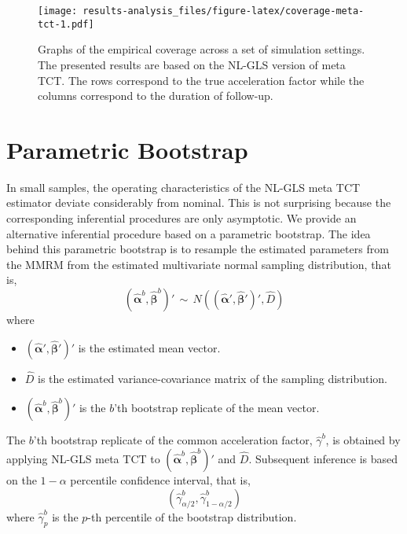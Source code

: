 \documentclass[
]{article}
\providecommand{\tightlist}{%
  \setlength{\itemsep}{0pt}\setlength{\parskip}{0pt}}
\begin{document}
\begin{figure}
\centering
\texttt{[image: results-analysis\_files/figure-latex/coverage-meta-tct-1.pdf]}
\caption{\label{fig:coverage-meta-tct}Graphs of the empirical coverage across a set of simulation settings. The presented results are based on the NL-GLS version of meta TCT. The rows correspond to the true acceleration factor while the columns correspond to the duration of follow-up.}
\end{figure}

\hypertarget{parametric-bootstrap}{%
\section{Parametric Bootstrap}\label{parametric-bootstrap}}

In small samples, the operating characteristics of the NL-GLS meta TCT estimator
deviate considerably from nominal. This is not surprising because the
corresponding inferential procedures are only asymptotic. We provide an alternative
inferential procedure based on a parametric bootstrap. The idea behind this
parametric bootstrap is to resample the estimated parameters from the MMRM from
the estimated multivariate normal sampling distribution, that is,
\[(\hat{\boldsymbol{\alpha}}^{b}, \hat{\boldsymbol{\beta}}^{b})' \, \sim \, N\left( (\hat{\boldsymbol{\alpha}}', \hat{\boldsymbol{\beta}}')', \hat{D}  \right)\]
where

\begin{itemize}
\tightlist
\item
  \((\hat{\boldsymbol{\alpha}}', \hat{\boldsymbol{\beta}}')'\) is the estimated
  mean vector.
\item
  \(\hat{D}\) is the estimated variance-covariance matrix of the sampling
  distribution.
\item
  \((\hat{\boldsymbol{\alpha}}^{b}, \hat{\boldsymbol{\beta}}^{b})'\) is the \(b\)'th
  bootstrap replicate of the mean vector.
\end{itemize}

The \(b\)'th bootstrap replicate of the common acceleration factor,
\(\hat{\gamma}^b\), is obtained by applying NL-GLS meta TCT to
\((\hat{\boldsymbol{\alpha}}^{b}, \hat{\boldsymbol{\beta}}^{b})'\) and
\(\hat{D}\). Subsequent inference is based on the \(1 - \alpha\) percentile
confidence interval, that is, \[(\hat{\gamma}^b_{\alpha / 2}, \hat{\gamma}^b_{1
- \alpha / 2})\] where \(\hat{\gamma}^b_{p}\) is the \(p\)-th percentile of the
bootstrap distribution.
\end{document}
